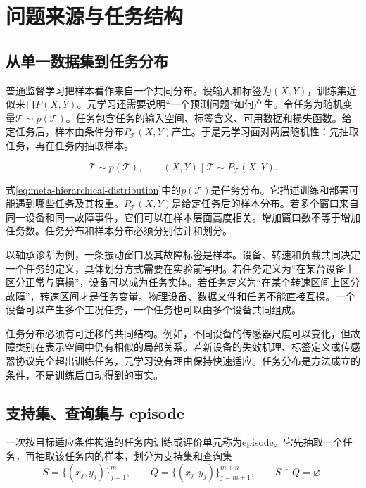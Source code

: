 \section{问题来源与任务结构}

\subsection{从单一数据集到任务分布}

普通监督学习把样本看作来自一个共同分布。设输入和标签为$(X,Y)$，训练集近似来自$P(X,Y)$。元学习还需要说明“一个预测问题”如何产生。令任务为随机变量$\mathcal T\sim p(\mathcal T)$。任务包含任务的输入空间、标签含义、可用数据和损失函数。给定任务后，样本由条件分布$P_{\mathcal T}(X,Y)$产生。于是元学习面对两层随机性：先抽取任务，再在任务内抽取样本。

\begin{equation}
\mathcal T\sim p(\mathcal T),\qquad (X,Y)\mid\mathcal T\sim P_{\mathcal T}(X,Y).
\label{eq:meta-hierarchical-distribution}
\end{equation}

式\eqref{eq:meta-hierarchical-distribution}中的$p(\mathcal T)$是任务分布。它描述训练和部署可能遇到哪些任务及其权重。$P_{\mathcal T}(X,Y)$是给定任务后的样本分布。若多个窗口来自同一设备和同一故障事件，它们可以在样本层面高度相关。增加窗口数不等于增加任务数。任务分布和样本分布必须分别估计和划分。

以轴承诊断为例，一条振动窗口及其故障标签是样本。设备、转速和负载共同决定一个任务的定义，具体划分方式需要在实验前写明。若任务定义为“在某台设备上区分正常与磨损”，设备可以成为任务实体。若任务定义为“在某个转速区间上区分故障”，转速区间才是任务变量。物理设备、数据文件和任务不能直接互换。一个设备可以产生多个工况任务，一个任务也可以由多个设备共同组成。

任务分布必须有可迁移的共同结构。例如，不同设备的传感器尺度可以变化，但故障类别在表示空间中仍有相似的局部关系。若新设备的失效机理、标签定义或传感器协议完全超出训练任务，元学习没有理由保持快速适应。任务分布是方法成立的条件，不是训练后自动得到的事实。

\subsection{支持集、查询集与 episode}

一次按目标适应条件构造的任务内训练或评价单元称为episode。它先抽取一个任务，再抽取该任务内的样本，划分为支持集和查询集
\begin{equation}
S=\{(x_j,y_j)\}_{j=1}^{m},\qquad
Q=\{(x_j,y_j)\}_{j=m+1}^{m+n},\qquad S\cap Q=\varnothing.
\label{eq:meta-support-query-sets}
\end{equation}

